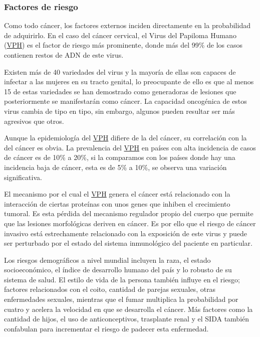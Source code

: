 \subsubsection{Factores de riesgo}
Como todo cáncer, los factores externos inciden directamente en la probabilidad
de adquirirlo. En el caso del cáncer cervical, el Virus del Papiloma Humano
(\hyperlink{abbr}{VPH})
 es el factor de riesgo más prominente, donde
más del 99\% de los casos contienen restos de ADN de este virus.


Existen más de 40 variedades del virus y la mayoría de ellas son capaces de infectar
a las mujeres en su tracto genital, lo preocupante de ello es que al menos 15 de 
estas variedades se han demostrado como generadoras de  lesiones que posteriormente
se manifestarán como cáncer. La capacidad oncogénica de estos virus cambia de tipo
en tipo, sin embargo, algunos pueden resultar ser más agresivos que otros. 

Aunque la epidemiología del \hyperlink{abbr}{VPH} difiere de la del cáncer, su
correlación con la del cáncer es obvia. La prevalencia del \hyperlink{abbr}{VPH}
en países con alta incidencia de casos de cáncer es de 10\% a 20\%, si la
comparamos con los países donde hay una incidencia baja de cáncer, esta es de
5\% a 10\%, se observa una variación significativa. 

El mecanismo por el cual el \hyperlink{abbr}{VPH} genera el cáncer está relacionado con la interacción
de ciertas proteínas con unos genes que inhiben el crecimiento tumoral. Es esta pérdida
del mecanismo regulador propio del cuerpo que permite que las lesiones morfológicas
deriven en cáncer. Es por ello que el riesgo de cáncer invasivo está estrechamente
relacionado con la exposición de este virus y puede ser perturbado por el estado
del sistema inmunológico del paciente en particular. 

Los riesgos demográficos a nivel mundial incluyen la raza, el estado socioeconómico,
el índice de desarrollo humano del país y lo robusto de su sistema de salud. El estilo
de vida de la persona también influye en el riesgo; factores relacionados con el coito,
cantidad de parejas sexuales, otras enfermedades sexuales, mientras que el fumar
multiplica la probabilidad por cuatro y acelera la velocidad en que se desarrolla el 
cáncer. Más factores como la cantidad de hijos, el uso de anticonceptivos, trasplante
renal y el SIDA también confabulan para incrementar el riesgo de padecer esta enfermedad.

